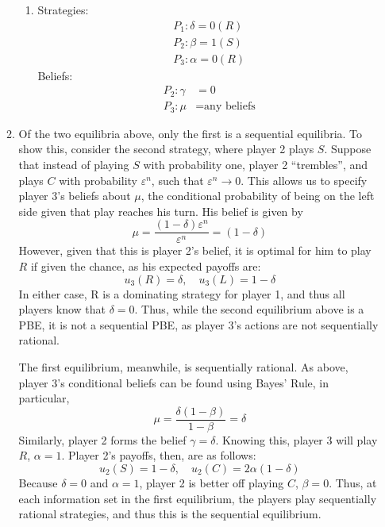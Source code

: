 \documentclass[11pt]{article}
\begin{document}
\begin{enumerate}
\begin{enumerate}
\begin{enumerate}[label = \roman*.]
			\item Strategies:
			\begin{gather*}
			P_1: \delta = 0 (R) \\
			P_2: \beta = 1 (S) \\
			P_3: \alpha = 0 (R)
			\end{gather*}
			Beliefs:
			\begin{align*}
			P_2: \gamma &= 0 \\
			P_3: \mu &= \text{any beliefs}
			\end{align*}
		\end{enumerate}
	
		\item Of the two equilibria above, only the first is a sequential equilibria. To show this, consider the second strategy, where player 2 plays $ S $. Suppose that instead of playing $ S $ with probability one, player 2 ``trembles'', and plays $ C $ with probability $ \varepsilon^n $, such that $ \varepsilon^n\to 0 $. This allows us to specify player 3's beliefs about $\mu$, the conditional probability of being on the left side given that play reaches his turn. His belief is given by
		\[\mu = \frac{(1 - \delta)\varepsilon^n}{\varepsilon^n} = (1 - \delta)\]
		However, given that this is player 2's belief, it is optimal for him to play $ R $ if given the chance, as his expected payoffs are:
		\[u_3(R) = \delta,\quad u_3(L) = 1 - \delta \]
		In either case, R is a dominating strategy for player 1, and thus all players know that $\delta = 0$. Thus, while the second equilibrium above is a PBE, it is not a sequential PBE, as player 3's actions are not sequentially rational. 
		
		The first equilibrium, meanwhile, is sequentially rational. As above, player 3's conditional beliefs can be found using Bayes' Rule, in particular,
		\[\mu = \frac{\delta (1 - \beta)}{1 - \beta} = \delta\]
		Similarly, player 2 forms the belief $ \gamma = \delta $. Knowing this, player 3 will play $ R $, $\alpha = 1$. Player 2's payoffs, then, are as follows:
		\[u_2(S) = 1 - \delta, \quad u_2(C) = 2\alpha(1 - \delta)\]
		Because $\delta = 0$ and $\alpha = 1$, player 2 is better off playing $ C $, $\beta = 0$. Thus, at each information set in the first equilibrium, the players play sequentially rational strategies, and thus this is the sequential equilibrium. 
	\end{enumerate}
\end{enumerate}
\end{document}
